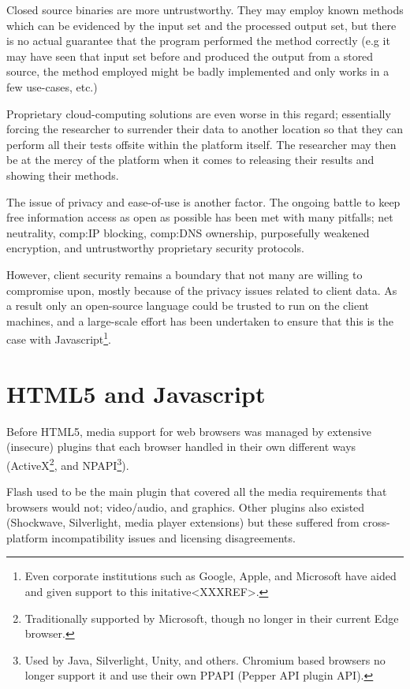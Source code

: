 Closed source binaries are more untrustworthy. They may employ known methods which can be evidenced by the input set and the processed output set, but there is no actual guarantee that the program performed the method correctly (e.g it may have seen that input set before and produced the output from a stored source, the method employed might be badly implemented and only works in a few use-cases, etc.)

Proprietary cloud-computing solutions are even worse in this regard; essentially forcing the researcher to surrender their data to another location so that they can perform all their tests offsite within the platform itself. The researcher may then be at the mercy of the platform when it comes to releasing their results and showing their methods.

The issue of privacy and ease-of-use is another factor. The ongoing battle to keep free information access as open as possible has been met with many pitfalls; net neutrality, \gls{comp:IP} blocking, \gls{comp:DNS} ownership, purposefully weakened encryption, and untrustworthy proprietary security protocols. 

However, client security remains a boundary that not many are willing to compromise upon, mostly because of the privacy issues related to client data. As a result only an open-source language could be trusted to run on the client machines, and a large-scale effort has been undertaken to ensure that this is the case with Javascript\footnote{Even corporate institutions such as Google, Apple, and Microsoft have aided and given support to this initative<XXXREF>.}.


\section{HTML5 and Javascript}

Before HTML5, media support for web browsers was managed by extensive (insecure) plugins that each browser handled in their own different ways (ActiveX\footnote{Traditionally supported by Microsoft, though no longer in their current Edge browser.}, and NPAPI\footnote{Used by Java, Silverlight, Unity, and others. Chromium based browsers no longer support it and use their own PPAPI (Pepper API plugin API).}).

Flash used to be the main plugin that covered all the media requirements that browsers would not; video/audio, and graphics. Other plugins also existed (Shockwave, Silverlight, media player extensions) but these suffered from cross-platform incompatibility issues and licensing disagreements.

